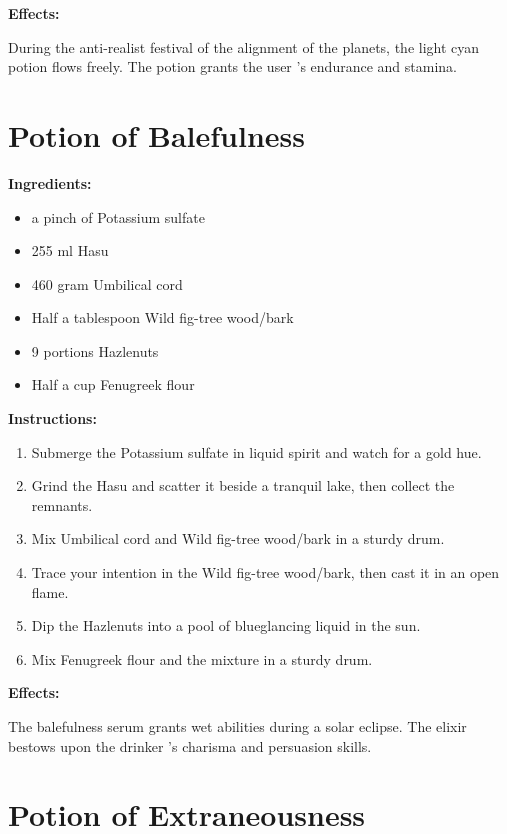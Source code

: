 \documentclass{article}
\begin{document}
\textbf{Effects:}

During the anti-realist festival of the alignment of the planets, the light cyan potion flows freely. The potion grants the user 's endurance and stamina.

\newpage
\section*{Potion of Balefulness}

\textbf{Ingredients:}

\begin{itemize}
  \item a pinch of Potassium sulfate
  \item 255 ml Hasu
  \item 460 gram Umbilical cord
  \item Half a tablespoon Wild fig-tree wood/bark
  \item 9 portions Hazlenuts
  \item Half a cup Fenugreek flour
\end{itemize}

\textbf{Instructions:}

\begin{enumerate}
  \item Submerge the Potassium sulfate in liquid spirit and watch for a gold hue.
  \item Grind the Hasu and scatter it beside a tranquil lake, then collect the remnants.
  \item Mix Umbilical cord and Wild fig-tree wood/bark in a sturdy drum.
  \item Trace your intention in the Wild fig-tree wood/bark, then cast it in an open flame.
  \item Dip the Hazlenuts into a pool of blueglancing liquid in the sun.
  \item Mix Fenugreek flour and the mixture in a sturdy drum.
\end{enumerate}

\textbf{Effects:}

The balefulness serum grants wet abilities during a solar eclipse. The elixir bestows upon the drinker 's charisma and persuasion skills.

\newpage
\section*{Potion of Extraneousness}
\end{document}
